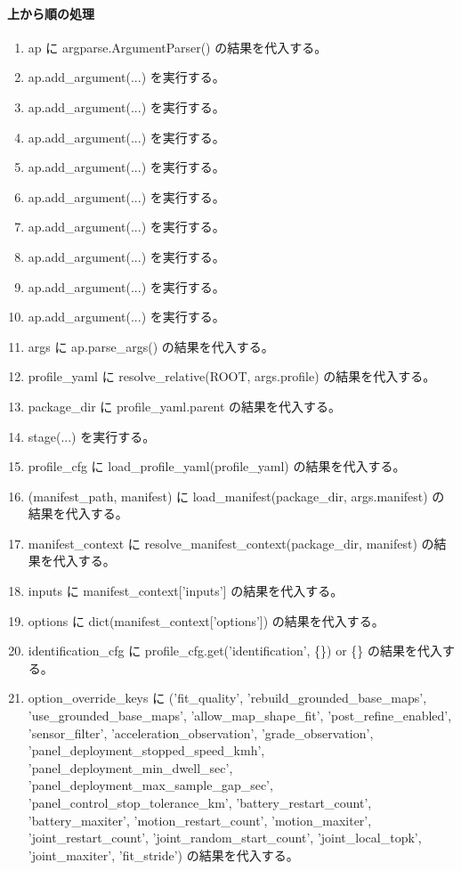 \documentclass[a4paper,11pt]{article}
\begin{document}
            \paragraph{上から順の処理}
            \begin{enumerate}[leftmargin=1.8em]
            \item ap に argparse.ArgumentParser() の結果を代入する。
\item ap.add\_argument(...) を実行する。
\item ap.add\_argument(...) を実行する。
\item ap.add\_argument(...) を実行する。
\item ap.add\_argument(...) を実行する。
\item ap.add\_argument(...) を実行する。
\item ap.add\_argument(...) を実行する。
\item ap.add\_argument(...) を実行する。
\item ap.add\_argument(...) を実行する。
\item ap.add\_argument(...) を実行する。
\item args に ap.parse\_args() の結果を代入する。
\item profile\_yaml に resolve\_relative(ROOT, args.profile) の結果を代入する。
\item package\_dir に profile\_yaml.parent の結果を代入する。
\item stage(...) を実行する。
\item profile\_cfg に load\_profile\_yaml(profile\_yaml) の結果を代入する。
\item (manifest\_path, manifest) に load\_manifest(package\_dir, args.manifest) の結果を代入する。
\item manifest\_context に resolve\_manifest\_context(package\_dir, manifest) の結果を代入する。
\item inputs に manifest\_context['inputs'] の結果を代入する。
\item options に dict(manifest\_context['options']) の結果を代入する。
\item identification\_cfg に profile\_cfg.get('identification', \{\}) or \{\} の結果を代入する。
\item option\_override\_keys に ('fit\_quality', 'rebuild\_grounded\_base\_maps', 'use\_grounded\_base\_maps', 'allow\_map\_shape\_fit', 'post\_refine\_enabled', 'sensor\_filter', 'acceleration\_observation', 'grade\_observation', 'panel\_deployment\_stopped\_speed\_kmh', 'panel\_deployment\_min\_dwell\_sec', 'panel\_deployment\_max\_sample\_gap\_sec', 'panel\_control\_stop\_tolerance\_km', 'battery\_restart\_count', 'battery\_maxiter', 'motion\_restart\_count', 'motion\_maxiter', 'joint\_restart\_count', 'joint\_random\_start\_count', 'joint\_local\_topk', 'joint\_maxiter', 'fit\_stride') の結果を代入する。

\end{enumerate}
\end{document}
